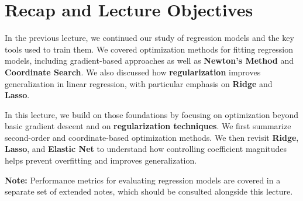 \documentclass{article}
\begin{document}





\section{Recap and Lecture Objectives}

In the previous lecture, we continued our study of regression models and the key tools used to train them. We covered optimization methods for fitting regression models, including gradient-based approaches as well as \textbf{Newton’s Method} and \textbf{Coordinate Search}. We also discussed how \textbf{regularization} improves generalization in linear regression, with particular emphasis on \textbf{Ridge} and \textbf{Lasso}.

In this lecture, we build on those foundations by focusing on optimization beyond basic gradient descent and on \textbf{regularization techniques}. We first summarize second-order and coordinate-based optimization methods. We then revisit \textbf{Ridge}, \textbf{Lasso}, and \textbf{Elastic Net} to understand how controlling coefficient magnitudes helps prevent overfitting and improves generalization.

\textbf{Note:} Performance metrics for evaluating regression models are covered in a separate set of extended notes, which should be consulted alongside this lecture.
\end{document}
